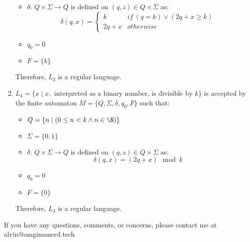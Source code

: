 \documentclass{math}
\begin{document}
\begin{enumerate}
\begin{itemize}
    \item \( \delta \): \( Q\times\Sigma\to Q \) is defined on \( (q,z)\in
    Q\times\Sigma \) as:
    \[ \delta(q,x) = \begin{cases}
      k & if\ (q = k) \vee (2q+x \ge k) \\
      2q+x & otherwise
    \end{cases} \]
    \item \( q_0 = 0 \)
    \item \( F = \{k\} \)
  \end{itemize}
  Therefore, \( L_3 \) is a regular language.
  \item \( L_4 = \{x\mid x,\text{ interpreted as a binary number, is divisible
  by } k\} \) is accepted by the finite automaton \( M =
  \{Q,\Sigma,\delta,q_0,F\} \) such that:
  \begin{itemize}
    \item \( Q = \{n\mid(0\le n<k \wedge n\in\N)\} \)
    \item \( \Sigma = \{0,1\} \)
    \item \( \delta \): \( Q\times\Sigma\to Q \) is defined on \( (q,z)\in
    Q\times\Sigma \) as:
    \[ \delta(q,x) = (2q+x)\mod k \]
    \item \( q_0 = 0 \)
    \item \( F = \{0\} \)
  \end{itemize}
  Therefore, \( L_4 \) is a regular language.
\end{enumerate}

\begin{center}
  If you have any questions, comments, or concerns, please contact me at
  alvin@omgimanerd.tech
\end{center}
\end{document}
